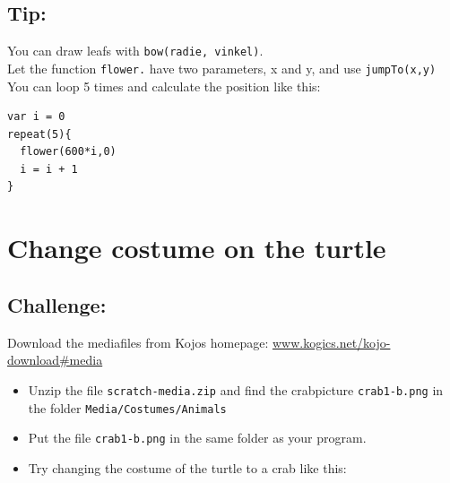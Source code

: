 \section*{\color{OliveGreen}Tip:}
You can draw leafs with \lstinline{bow(radie, vinkel)}. \\
Let the function \lstinline{flower.} have two parameters, x and y, and use \lstinline{jumpTo(x,y)}\\
You can loop 5 times and calculate the position like this:

\begin{lstlisting}[basicstyle={\ttfamily\fontsize{18}{22}\selectfont},numbers=none]
var i = 0          
repeat(5){
  flower(600*i,0)
  i = i + 1        
}
\end{lstlisting}
        
\chapter{Change costume on the turtle}\section*{\color{BrickRed}Challenge:}
Download the mediafiles from Kojos homepage:
\href{http://www.kogics.net/kojo-download#media}{www.kogics.net/kojo-download\#media}


\begin{itemize}

\item {Unzip the file \lstinline{scratch-media.zip} and find the crabpicture \lstinline{crab1-b.png} in the folder \lstinline{Media/Costumes/Animals}}
\item {Put the file \lstinline{crab1-b.png} in the same folder as your program.}
\item {Try changing the costume of the turtle to a crab like this:}

\end{itemize}



  

